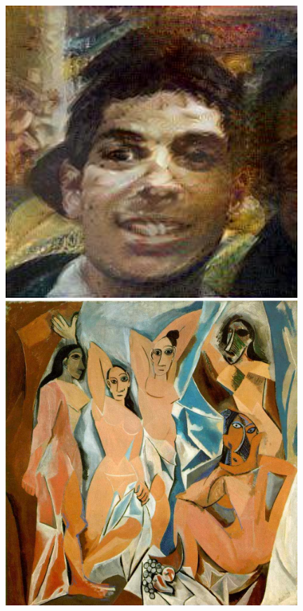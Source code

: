 \documentclass{article}
\begin{document}
\begin{figure}[!htb]
\begin{minipage}{0.25\textwidth}
\includegraphics[width=0.98\textwidth]{../Images/transfer/tdf_delacroix.jpg}
\end{minipage}%
\begin{minipage}{0.25\textwidth}
\centering
\includegraphics[width=0.98\textwidth]{../Images/demoiselles.jpg}

\end{minipage}
\end{figure}
\end{document}
